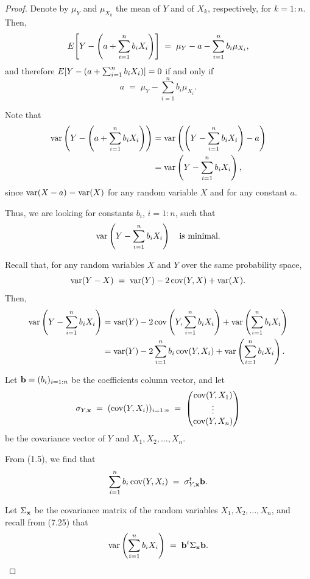 \begin{proof}
Denote by $\mu_Y$ and $\mu_{X_k}$ the mean of $Y$ and of $X_k$, respectively, for
$k=1:n$. Then,
\[
E\!\left[Y - \left(a+\sum_{i=1}^n b_iX_i\right)\right] \;=\; \mu_Y - a - \sum_{i=1}^n b_i\mu_{X_i},
\]
and therefore $E\!\left[Y-\left(a+\sum_{i=1}^n b_iX_i\right)\right] = 0$ if and only if
\begin{equation}
a \;=\; \mu_Y - \sum_{i=1}^n b_i\mu_{X_i}.
\end{equation}

Note that
\begin{align*}
\operatorname{var}\left(Y-\left(a+\sum_{i=1}^n b_iX_i\right)\right) &= \operatorname{var}\left(\left(Y-\sum_{i=1}^n
b_iX_i\right)-a\right)\\
&= \operatorname{var}\left(Y-\sum_{i=1}^n b_iX_i\right),
\end{align*}
since $\operatorname{var}(X-a) = \operatorname{var}(X)$ for any random variable $X$ and for any constant $a$.

Thus, we are looking for constants $b_i$, $i=1:n$, such that
\begin{equation}
\operatorname{var}\left(Y-\sum_{i=1}^n b_iX_i\right) \quad \text{is minimal.}
\end{equation}

Recall that, for any random variables $X$ and $Y$ over the same probability space,
\[
\operatorname{var}(Y-X) \;=\; \operatorname{var}(Y) - 2\operatorname{cov}(Y,X) + \operatorname{var}(X).
\]
Then,
\begin{align}
\operatorname{var}\left(Y-\sum_{i=1}^n b_iX_i\right) &= \operatorname{var}(Y) - 2\operatorname{cov}\left(Y,\sum_{i=1}^n
b_iX_i\right) + \operatorname{var}\left(\sum_{i=1}^n b_iX_i\right) \notag\\
&= \operatorname{var}(Y) - 2\sum_{i=1}^n b_i\operatorname{cov}(Y,X_i) + \operatorname{var}\left(\sum_{i=1}^n b_iX_i\right).
\end{align}

Let $\mathbf{b} = (b_i)_{i=1:n}$ be the coefficients column vector, and let
\[
\sigma_{Y,\mathbf{x}} \;=\; (\operatorname{cov}(Y,X_i))_{i=1:n} \;=\; \begin{pmatrix} \operatorname{cov}(Y,X_1) \\ \vdots \\
\operatorname{cov}(Y,X_n) \end{pmatrix}
\]
be the covariance vector of $Y$ and $X_1, X_2, \ldots, X_n$.

From (1.5), we find that
\begin{equation}
\sum_{i=1}^n b_i\operatorname{cov}(Y,X_i) \;=\; \sigma_{Y,\mathbf{x}}^t\mathbf{b}.
\end{equation}

Let $\Sigma_{\mathbf{x}}$ be the covariance matrix of the random variables $X_1, X_2, \ldots,
X_n$, and recall from (7.25) that
\begin{equation}
\operatorname{var}\left(\sum_{i=1}^n b_iX_i\right) \;=\; \mathbf{b}^t\Sigma_{\mathbf{x}}\mathbf{b}.
\end{equation}


\end{proof}
